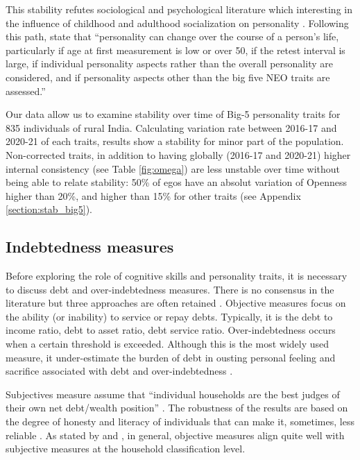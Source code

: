 \documentclass[a4paper, 11pt, onecolumn]{article}
\begin{document}
This stability refutes sociological and psychological literature which interesting in the influence of childhood and adulthood socialization on personality \citep{Mortimer1978, Moen1995}.
Following this path, \cite{Ardelt2000} state that ``personality can change over the course of a person's life, particularly if age at first measurement is low or over 50, if the retest interval is large, if individual personality aspects rather than the overall personality are considered, and if personality aspects other than the big five NEO traits are assessed.''

Our data allow us to examine stability over time of Big-5 personality traits for 835 individuals of rural India.
Calculating variation rate between 2016-17 and 2020-21 of each traits, results show a stability for minor part of the population.
Non-corrected traits, in addition to having globally (2016-17 and 2020-21) higher internal consistency (see Table \ref{fig:omega}) are less unstable over time without being able to relate stability: 50\% of egos have an absolut variation of Openness higher than 20\%, and higher than 15\% for other traits (see Appendix \ref{section:stab_big5}).




	\subsection{Indebtedness measures}

Before exploring the role of cognitive skills and personality traits, it is necessary to discuss debt and over-indebtedness measures.
There is no consensus in the literature but three approaches are often retained \citep{Betti2007, Ferreira2000}.
Objective measures focus on the ability (or inability) to service or repay debts.
Typically, it is the debt to income ratio, debt to asset ratio, debt service ratio.
Over-indebtedness occurs when a certain threshold is exceeded.
Although this is the most widely used measure, it under-estimate the burden of debt in ousting personal feeling and sacrifice associated with debt and over-indebtedness \citep{Betti2007}.
 
Subjectives measure assume that ``individual households are the best judges of their own net debt/wealth position'' \citep{Betti2007}.
The robustness of the results are based on the degree of honesty and literacy of individuals that can make it, sometimes, less reliable \citep{Betti2007, DAlessio2013}.
As stated by \cite{Rinaldi2006} and \cite{Keese2012}, in general, objective measures align quite well with subjective measures at the household classification level.
\end{document}
